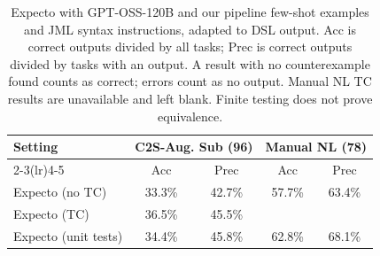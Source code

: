 \begin{table}[t]
\centering
\small
\begin{tabular}{lcccc}
\toprule
\textbf{Setting} & \multicolumn{2}{c}{\textbf{C2S-Aug. Sub (96)}} & \multicolumn{2}{c}{\textbf{Manual NL (78)}} \\
\cmidrule(lr){2-3}\cmidrule(lr){4-5}
& Acc & Prec & Acc & Prec \\
\midrule
Expecto (no TC) & 33.3\% & 42.7\% & 57.7\% & 63.4\% \\
Expecto (TC) & 36.5\% & 45.5\% &  &  \\
Expecto (unit tests) & 34.4\% & 45.8\% & 62.8\% & 68.1\% \\
\bottomrule
\end{tabular}
\caption{Expecto with GPT-OSS-120B and our pipeline few-shot examples and JML syntax instructions, adapted to DSL output. Acc is correct outputs divided by all tasks; Prec is correct outputs divided by tasks with an output. A result with no counterexample found counts as correct; errors count as no output. Manual NL TC results are unavailable and left blank. Finite testing does not prove equivalence.}
\label{tab:expecto-pipeline-fewshot}
\end{table}
